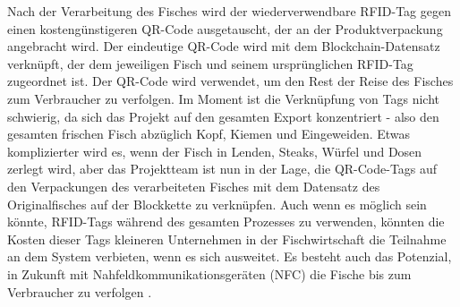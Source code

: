 Nach der Verarbeitung des Fisches wird der wiederverwendbare RFID-Tag gegen einen kostengünstigeren QR-Code ausgetauscht, der an der Produktverpackung angebracht wird. Der eindeutige QR-Code wird mit dem Blockchain-Datensatz verknüpft, der dem jeweiligen Fisch und seinem ursprünglichen RFID-Tag zugeordnet ist. Der QR-Code wird verwendet, um den Rest der Reise des Fisches zum Verbraucher zu verfolgen. Im Moment ist die Verknüpfung von Tags nicht schwierig, da sich das Projekt auf den gesamten Export konzentriert - also den gesamten frischen Fisch abzüglich Kopf, Kiemen und Eingeweiden. Etwas komplizierter wird es, wenn der Fisch in Lenden, Steaks, Würfel und Dosen zerlegt wird, aber das Projektteam ist nun in der Lage, die QR-Code-Tags auf den Verpackungen des verarbeiteten Fisches mit dem Datensatz des Originalfisches auf der Blockkette zu verknüpfen. Auch wenn es möglich sein könnte, RFID-Tags während des gesamten Prozesses zu verwenden, könnten die Kosten dieser Tags kleineren Unternehmen in der Fischwirtschaft die Teilnahme an dem System verbieten, wenn es sich ausweitet. Es besteht auch das Potenzial, in Zukunft mit Nahfeldkommunikationsgeräten (NFC) die Fische bis zum Verbraucher zu verfolgen \citep{Visser2017, McEntire2019}.

